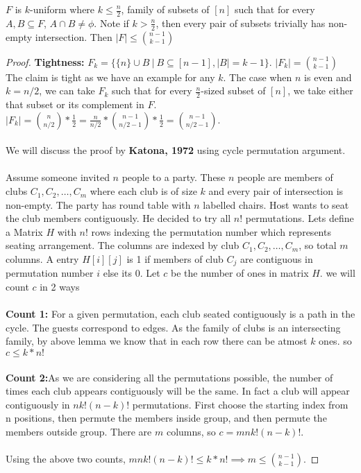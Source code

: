 \begin{theorem}
$F$ is $k$-uniform where $k\le \frac{n}{2}$, family of subsets of $[n]$ such that for every $A,B \subseteq F$, $A\cap B \neq \phi$. Note if $k> \frac{n}{2}$, then every pair of subsets trivially has non-empty intersection. Then $|F|\le {{n-1}\choose{k-1}}$

\begin{proof}
\textbf{Tightness:} $F_k=\{\{n\}\cup B ~|~ B\subseteq [n-1] ,|B|=k-1\}$. $|F_k|={{n-1}\choose{k-1}}$ The claim is tight as we have an example for any $k$.
The case when $n$ is even and $k=n/2$, we can take $F_k$ such that for every $\frac{n}{2}$-sized subset of $[n]$, we take either that subset or its complement in $F$. $|F_k|={{{n}\choose{n/2}}* \frac{1}{2}}=\frac{n}{n/2}* {{n-1}\choose n/2-1}* \frac{1}{2} = {{n-1}\choose{n/2-1}}$.\\\\
We will discuss the proof by \textbf{Katona, 1972} using cycle permutation argument.\\\\
Assume someone invited $n$ people to a party. These $n$ people are members of clubs $C_1, C_2, \hdots, C_m$ where each club is of size $k$ and every pair of intersection is non-empty. The party has round table with $n$ labelled chairs. Host wants to seat the club members contiguously. He decided to try all $n!$ permutations. Lets define a Matrix $H$ with $n!$ rows indexing the permutation number which represents seating arrangement. The columns are indexed by club $C_1, C_2, \hdots, C_m$, so total $m$ columns. A entry $H[i][j]$ is 1 if members of club $C_j$ are contiguous in permutation number $i$ else its 0. Let $c$ be the number of ones in matrix $H$. we will count $c$ in 2 ways\\\\
\textbf{Count 1:} For a given permutation, each club seated contiguously is a path in the cycle. The guests correspond to edges. As the family of clubs is an intersecting family, by above lemma we know that in each row there can be atmost $k$ ones. so $c \le k*n!$\\\\
\textbf{Count 2:}As we are considering all the permutations possible, the number of times each club appears contiguously will be the same. In fact a club will appear contiguously in $nk!(n-k)!$ permutations. First choose the starting index from n positions, then permute the members inside group, and then permute the members outside group. There are $m$ columns, so $c=mnk!(n-k)!$.\\\\
Using the above two counts, $mnk!(n-k)! \le k*n! \implies m \le {{n-1}\choose{k-1}}$.

\end{proof}
\end{theorem}
